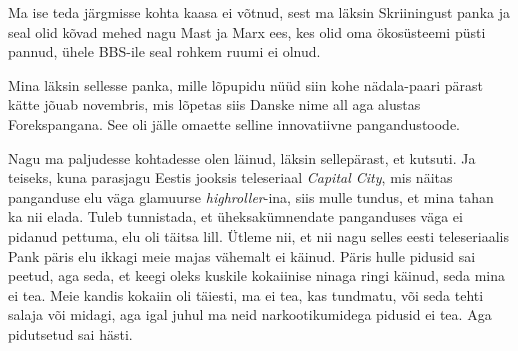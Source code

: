 Ma ise teda järgmisse kohta kaasa ei võtnud, sest ma läksin Skriiningust panka 
ja seal olid kõvad mehed nagu Mast ja  
Marx  ees, 
kes olid oma ökosüsteemi püsti pannud, ühele BBS-ile seal rohkem ruumi ei 
olnud. 


Mina läksin sellesse panka, mille lõpupidu nüüd siin kohe nädala-paari pärast 
kätte jõuab 
novembris, mis lõpetas siis Danske nime all aga alustas 
Forekspangana. See 
oli jälle omaette selline innovatiivne pangandustoode. 


Nagu ma paljudesse kohtadesse olen läinud, läksin sellepärast, et kutsuti. Ja 
teiseks, kuna parasjagu Eestis jooksis teleseriaal \emph{Capital City}, mis 
näitas panganduse elu väga glamuurse \emph{highroller}-ina, siis mulle tundus, 
et mina tahan ka nii elada. Tuleb tunnistada, et üheksakümnendate panganduses  
väga ei pidanud pettuma, elu oli täitsa lill. Ütleme nii, et nii nagu 
selles eesti teleseriaalis Pank päris elu ikkagi meie majas vähemalt ei käinud. 
Päris hulle pidusid sai peetud, aga seda, et keegi oleks kuskile kokaiinise  
ninaga ringi käinud, seda mina ei tea. Meie  kandis  kokaiin oli täiesti, ma 
ei tea, kas tundmatu, või seda tehti salaja või midagi, aga igal juhul ma neid 
narkootikumidega pidusid ei tea. Aga pidutsetud sai hästi.


